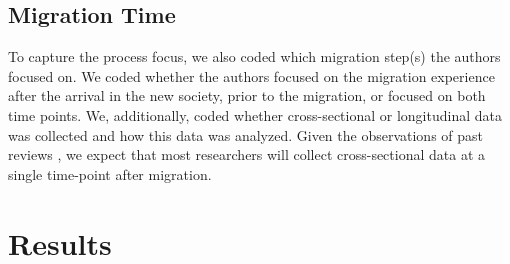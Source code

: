 \documentclass[man, 12pt, a4paper]{apa7}
\begin{document}
\subsection{Migration Time}
To capture the process focus, we also coded which migration step(s) the authors focused on. We coded whether the authors focused on the migration experience after the arrival in the new society, prior to the migration, or focused on both time points. We, additionally, coded whether cross-sectional or longitudinal data was collected and how this data was analyzed. Given the observations of past reviews \citep[e.g.,][]{Brown2011, Ward2019}, we expect that most researchers will collect cross-sectional data at a single time-point after migration.


\section{Results}


\printbibliography
\end{document}
